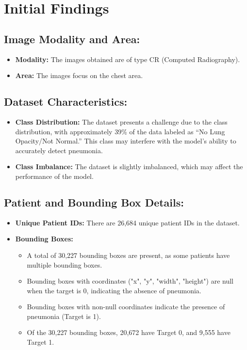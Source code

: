 \section{Initial Findings}
\label{sec:chap1 section 3}

\subsection{Image Modality and Area:}
\label{subsec:chap1 section 3.1}

\begin{itemize}
	\item \textbf{Modality:} The images obtained are of type CR (Computed Radiography).
	\item \textbf{Area:} The images focus on the chest area.
\end{itemize}

\subsection{Dataset Characteristics:}
\label{subsec:chap1 section 3.2}

\begin{itemize}
	\item \textbf{Class Distribution:} The dataset presents a challenge due to the class distribution, with approximately 39\% of the data labeled as “No Lung Opacity/Not Normal.” This class may interfere with the model's ability to accurately detect pneumonia.
	\item \textbf{Class Imbalance:} The dataset is slightly imbalanced, which may affect the performance of the model.
\end{itemize}

\subsection{Patient and Bounding Box Details:}
\label{subsec:chap1 section 3.3}

\begin{itemize}
	\item \textbf{Unique Patient IDs:} There are 26,684 unique patient IDs in the dataset.
	\item \textbf{Bounding Boxes:}
	      \begin{itemize}
		      \item A total of 30,227 bounding boxes are present, as some patients have multiple bounding boxes.
		      \item Bounding boxes with coordinates ("x", "y", "width", "height") are null when the target is 0, indicating the absence of pneumonia.
		      \item Bounding boxes with non-null coordinates indicate the presence of pneumonia (Target is 1).
		      \item Of the 30,227 bounding boxes, 20,672 have Target 0, and 9,555 have Target 1.
	      \end{itemize}
\end{itemize}

